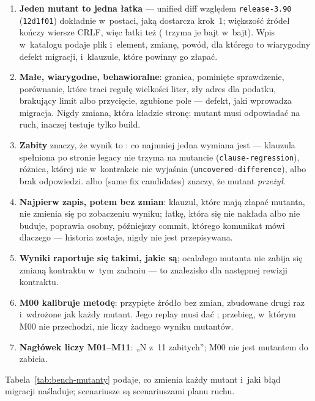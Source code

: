 \begin{enumerate}
  \item \textbf{Jeden mutant to jedna łatka} --- unified diff względem \texttt{release-3.90}
    (\texttt{12d1f01}) dokładnie w~postaci, jaką dostarcza krok~1; większość źródeł kończy
    wiersze CRLF, więc łatki też ( trzyma je bajt w~bajt). Wpis
    w~katalogu podaje plik i~element, zmianę, powód, dla którego to wiarygodny defekt
    migracji, i~klauzule, które powinny go złapać.
  \item \textbf{Małe, wiarygodne, behawioralne}: granica, pominięte sprawdzenie, porównanie,
    które traci regułę wielkości liter, zły adres dla podatku, brakujący limit albo
    przycięcie, zgubione pole --- defekt, jaki wprowadza migracja. Nigdy zmiana, która kładzie
    stronę: mutant musi odpowiadać na ruch, inaczej testuje tylko build.
  \item \textbf{Zabity} znaczy, że wynik  to : co
    najmniej jedna wymiana jest  --- klauzula spełniona po stronie legacy
    nie trzyma na mutancie (\texttt{clause-regression}), różnica, której nic w~kontrakcie nie
    wyjaśnia (\texttt{uncovered-difference}), albo brak odpowiedzi.  albo
     (same fix candidates) znaczy, że mutant \emph{przeżył}.
  \item \textbf{Najpierw zapis, potem bez zmian}: klauzul, które mają złapać mutanta, nie
    zmienia się po zobaczeniu wyniku; łatkę, która się nie nakłada albo nie buduje, poprawia
    osobny, późniejszy commit, którego komunikat mówi dlaczego --- historia zostaje, nigdy nie
    jest przepisywana.
  \item \textbf{Wyniki raportuje się takimi, jakie są}; ocalałego mutanta nie zabija się
    zmianą kontraktu w~tym zadaniu --- to znalezisko dla następnej rewizji kontraktu.
  \item \textbf{M00 kalibruje metodę}: przypięte źródło bez zmian, zbudowane drugi raz
    i~wdrożone jak każdy mutant. Jego replay musi dać ; przebieg, w~którym
    M00 nie przechodzi, nie liczy żadnego wyniku mutantów.
  \item \textbf{Nagłówek liczy M01--M11}: „N z~11 zabitych”; M00 nie jest mutantem do zabicia.
\end{enumerate}

Tabela~\ref{tab:bench-mutanty} podaje, co zmienia każdy mutant i~jaki błąd migracji
naśladuje; scenariusze są scenariuszami planu ruchu.

